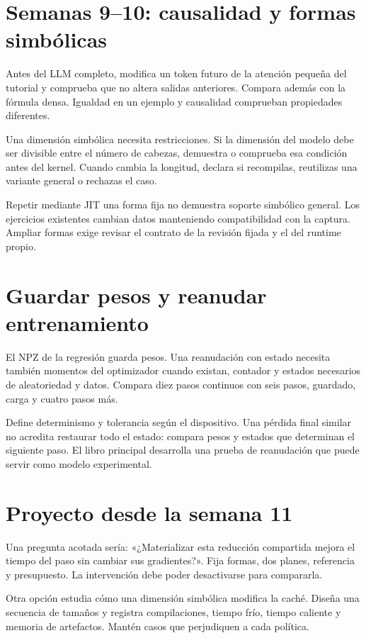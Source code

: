 \documentclass[12pt,a4paper,oneside]{report}
\begin{document}
\section{Semanas 9--10: causalidad y formas simbólicas}
Antes del LLM completo, modifica un token futuro de la atención pequeña del tutorial y comprueba que no altera salidas anteriores. Compara además con la fórmula densa. Igualdad en un ejemplo y causalidad comprueban propiedades diferentes.

Una dimensión simbólica necesita restricciones. Si la dimensión del modelo debe ser divisible entre el número de cabezas, demuestra o comprueba esa condición antes del kernel. Cuando cambia la longitud, declara si recompilas, reutilizas una variante general o rechazas el caso.

Repetir mediante JIT una forma fija no demuestra soporte simbólico general. Los ejercicios existentes cambian datos manteniendo compatibilidad con la captura. Ampliar formas exige revisar el contrato de la revisión fijada y el del runtime propio.

\section{Guardar pesos y reanudar entrenamiento}
El NPZ de la regresión guarda pesos. Una reanudación con estado necesita también momentos del optimizador cuando existan, contador y estados necesarios de aleatoriedad y datos. Compara diez pasos continuos con seis pasos, guardado, carga y cuatro pasos más.

Define determinismo y tolerancia según el dispositivo. Una pérdida final similar no acredita restaurar todo el estado: compara pesos y estados que determinan el siguiente paso. El libro principal desarrolla una prueba de reanudación que puede servir como modelo experimental.

\section{Proyecto desde la semana 11}
Una pregunta acotada sería: «¿Materializar esta reducción compartida mejora el tiempo del paso sin cambiar sus gradientes?». Fija formas, dos planes, referencia y presupuesto. La intervención debe poder desactivarse para compararla.

Otra opción estudia cómo una dimensión simbólica modifica la caché. Diseña una secuencia de tamaños y registra compilaciones, tiempo frío, tiempo caliente y memoria de artefactos. Mantén casos que perjudiquen a cada política.
\end{document}
